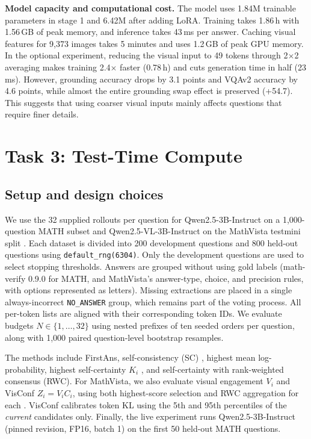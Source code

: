 \documentclass{article}
\begin{document}
\textbf{Model capacity and computational cost.} The model uses 1.84M trainable parameters in stage 1 and 6.42M after adding LoRA. Training takes 1.86\,h with 1.56\,GB of peak memory, and inference takes 43\,ms per answer. Caching visual features for 9,373 images takes 5 minutes and uses 1.2\,GB of peak GPU memory. In the optional experiment, reducing the visual input to 49 tokens through 2$\times$2 averaging makes training 2.4$\times$ faster (0.78\,h) and cuts generation time in half (23\,ms). However, grounding accuracy drops by 3.1 points and VQAv2 accuracy by 4.6 points, while almost the entire grounding swap effect is preserved (+54.7). This suggests that using coarser visual inputs mainly affects questions that require finer details.

\section{Task 3: Test-Time Compute}
\label{sec:task3}

\subsection{Setup and design choices}

We use the 32 supplied rollouts per question for Qwen2.5-3B-Instruct on a 1,000-question MATH subset \citep{math} and Qwen2.5-VL-3B-Instruct \citep{qwen25vl} on the MathVista testmini split \citep{mathvista}. Each dataset is divided into 200 development questions and 800 held-out questions using \texttt{default\_rng(6304)}. Only the development questions are used to select stopping thresholds. Answers are grouped without using gold labels (math-verify 0.9.0 for MATH, and MathVista's answer-type, choice, and precision rules, with options represented as letters). Missing extractions are placed in a single always-incorrect \texttt{NO\_ANSWER} group, which remains part of the voting process. All per-token lists are aligned with their corresponding token IDs. We evaluate budgets $N\in\{1,\dots,32\}$ using nested prefixes of ten seeded orders per question, along with 1,000 paired question-level bootstrap resamples.

The methods include FirstAns, self-consistency (SC) \citep{selfconsistency}, highest mean log-probability, highest self-certainty $K_i$ \citep{selfcertainty}, and self-certainty with rank-weighted consensus (RWC). For MathVista, we also evaluate visual engagement $V_i$ and VisConf $Z_i=V_iC_i$, using both highest-score selection and RWC aggregation for each \citep{visconf}. VisConf calibrates token KL using the 5th and 95th percentiles of the \emph{current} candidates only. Finally, the live experiment runs Qwen2.5-3B-Instruct (pinned revision, FP16, batch 1) on the first 50 held-out MATH questions.
\end{document}

